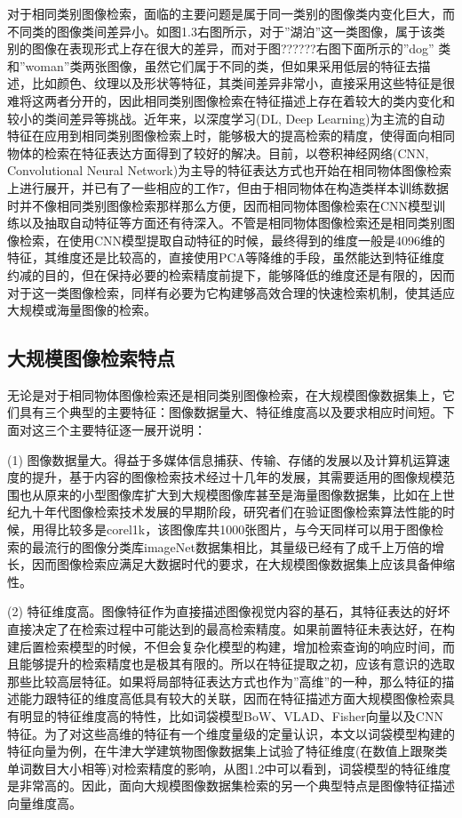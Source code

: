 \documentclass[color=cyan,mathpazo,titlestyle=hang]{elegantbook}
\begin{document}
对于相同类别图像检索，面临的主要问题是属于同一类别的图像类内变化巨大，而不同类的图像类间差异小。如图1.3右图所示，对于”湖泊”这一类图像，属于该类别的图像在表现形式上存在很大的差异，而对于图??????右图下面所示的”dog” 类和”woman”类两张图像，虽然它们属于不同的类，但如果采用低层的特征去描述，比如颜色、纹理以及形状等特征，其类间差异非常小，直接采用这些特征是很难将这两者分开的，因此相同类别图像检索在特征描述上存在着较大的类内变化和较小的类间差异等挑战。近年来，以深度学习(DL, Deep Learning)为主流的自动特征在应用到相同类别图像检索上时，能够极大的提高检索的精度，使得面向相同物体的检索在特征表达方面得到了较好的解决。目前，以卷积神经网络(CNN, Convolutional Neural Network)为主导的特征表达方式也开始在相同物体图像检索上进行展开，并已有了一些相应的工作7，但由于相同物体在构造类样本训练数据时并不像相同类别图像检索那样那么方便，因而相同物体图像检索在CNN模型训练以及抽取自动特征等方面还有待深入。不管是相同物体图像检索还是相同类别图像检索，在使用CNN模型提取自动特征的时候，最终得到的维度一般是4096维的特征，其维度还是比较高的，直接使用PCA等降维的手段，虽然能达到特征维度约减的目的，但在保持必要的检索精度前提下，能够降低的维度还是有限的，因而对于这一类图像检索，同样有必要为它构建够高效合理的快速检索机制，使其适应大规模或海量图像的检索。

\subsection{大规模图像检索特点}

无论是对于相同物体图像检索还是相同类别图像检索，在大规模图像数据集上，它们具有三个典型的主要特征：图像数据量大、特征维度高以及要求相应时间短。下面对这三个主要特征逐一展开说明：

(1) 图像数据量大。得益于多媒体信息捕获、传输、存储的发展以及计算机运算速度的提升，基于内容的图像检索技术经过十几年的发展，其需要适用的图像规模范围也从原来的小型图像库扩大到大规模图像库甚至是海量图像数据集，比如在上世纪九十年代图像检索技术发展的早期阶段，研究者们在验证图像检索算法性能的时候，用得比较多是corel1k，该图像库共1000张图片，与今天同样可以用于图像检索的最流行的图像分类库imageNet数据集相比，其量级已经有了成千上万倍的增长，因而图像检索应满足大数据时代的要求，在大规模图像数据集上应该具备伸缩性。

(2) 特征维度高。图像特征作为直接描述图像视觉内容的基石，其特征表达的好坏直接决定了在检索过程中可能达到的最高检索精度。如果前置特征未表达好，在构建后置检索模型的时候，不但会复杂化模型的构建，增加检索查询的响应时间，而且能够提升的检索精度也是极其有限的。所以在特征提取之初，应该有意识的选取那些比较高层特征。如果将局部特征表达方式也作为”高维”的一种，那么特征的描述能力跟特征的维度高低具有较大的关联，因而在特征描述方面大规模图像检索具有明显的特征维度高的特性，比如词袋模型BoW、VLAD、Fisher向量以及CNN特征。为了对这些高维的特征有一个维度量级的定量认识，本文以词袋模型构建的特征向量为例，在牛津大学建筑物图像数据集上试验了特征维度(在数值上跟聚类单词数目大小相等)对检索精度的影响，从图1.2中可以看到，词袋模型的特征维度是非常高的。因此，面向大规模图像数据集检索的另一个典型特点是图像特征描述向量维度高。
\end{document}
